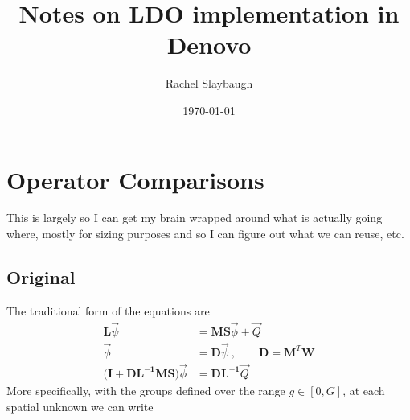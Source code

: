\documentclass[12pt,twoside]{article}
\date{\today}
\title{Notes on LDO implementation in Denovo}
\author{Rachel Slaybaugh}
\newcommand{\ve}[1]{\ensuremath{\mathbf{#1}}}
\begin{document}
\maketitle

\section*{Operator Comparisons}
This is largely so I can get my brain wrapped around what is actually going where, mostly for sizing purposes and so I can figure out what we can reuse, etc.

\subsection*{Original}
The traditional form of the equations are
\begin{align}
\ve{L}\vec{\psi} &= \ve{MS}\vec{\phi} + \vec{Q}\\
\vec{\phi} &= \ve{D}\vec{\psi}\:, \qquad \ve{D} = \ve{M}^T\ve{W} \\
\bigl(\ve{I} + \ve{DL^{-1} MS}\bigr)\vec{\phi} &= \ve{DL^{-1}}\vec{Q} 
\end{align}
%
More specifically, with the groups defined over the range $g\in[0,G]$,
at each spatial unknown we can write
\end{document}
